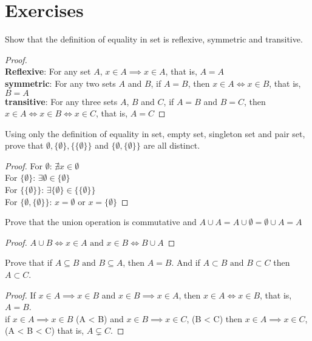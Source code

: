 \section{Exercises}

\begin{exercise}
  Show that the definition of equality in set is reflexive, symmetric and transitive.
\end{exercise}
\begin{proof}
  \\ \textbf{Reflexive}: For any set $A$, $x \in A \implies x \in A$, that is, $A = A$ \\
  \textbf{symmetric}: For any two sets $A$ and $B$, if $A = B$, then $x \in A \iff x \in B$, that is, $B = A$ \\
  \textbf{transitive}: For any three sets $A$, $B$ and $C$, if $A = B$ and $B = C$, then $x \in A \iff x \in B \iff x \in C$, that is, $A = C$
\end{proof}

\begin{exercise}
  Using only the definition of equality in set, empty set, singleton set and pair set, prove that $\emptyset, \{\emptyset\}, \{\{\emptyset\}\}$ and $\{\emptyset, \{\emptyset\}\}$
  are all distinct.
\end{exercise}
\begin{proof}
  For $\emptyset$: $\nexists x \in \emptyset$ \\
  For $\{\emptyset\}$: $\exists \emptyset \in \{\emptyset\}$ \\ 
  For $\{\{\emptyset\}\}$: $\exists \{\emptyset\} \in \{\{\emptyset\}\}$ \\
  For $\{\emptyset, \{\emptyset\}\}$: $x = \emptyset \text{\ or\ } x = \{\emptyset\}$
\end{proof} 

\begin{exercise}
  Prove that the union operation is commutative and $A \cup A = A \cup \emptyset = \emptyset \cup A = A$
\end{exercise}
\begin{proof}
  $A \cup B \iff x \in A \text{\ and\ } x \in B \iff B \cup A$
\end{proof}

\begin{exercise}
  Prove that if $A \subseteq B \text{\ and\ } B \subseteq A$, then $A = B$. And if $A \subset B \text{\ and\ } B \subset C$ then $A \subset C$.
\end{exercise}
\begin{proof}
  If $x \in A \implies x \in B$ and $x \in B \implies x \in A$, then $x \in A \iff x \in B$, that is, $A = B$. \\
  if $x \in A \implies x \in B$ (A < B) and $x \in B \implies x \in C$, (B < C) 
  then $x \in A \implies x \in C$, (A < B < C) that is, $A \subsetneq C$.
\end{proof}

